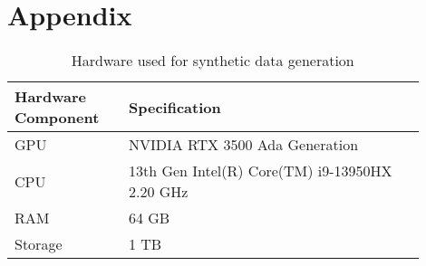 \documentclass[../report.tex]{subfiles}
\begin{document}
    \section*{Appendix}
    \label{sec:appendix}

        
    
     \begin{table}[ht]
        \caption{Hardware used for synthetic data generation}
        \label{tab:softRequirementforSyntheticDataGeneration} %
        \begin{tabular}{M{0.25\linewidth} M{0.65\linewidth}}
            \hline
             Hardware Component &  Specification \\\hline
            GPU & NVIDIA RTX 3500 Ada Generation \\\hline
            CPU & 13th Gen Intel(R) Core(TM) i9-13950HX 2.20 GHz \\\hline
            RAM & 64 GB \\\hline
            Storage & 1 TB  \\\hline
        \end{tabular}
    \end{table}
    
    



\end{document}
